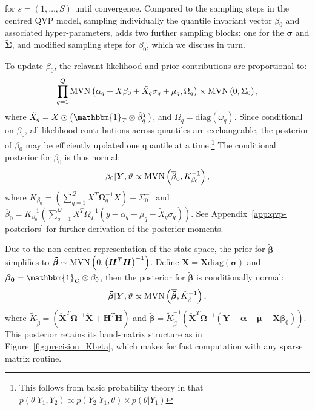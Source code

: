 %
for $s=(1,\dotsc,S)$ until convergence. Compared to the sampling steps in the centred QVP model, sampling individually the quantile invariant vector $\beta_0$ and associated hyper-parameters, adds two further sampling blocks: one for the $\boldsymbol{\sigma}$ and $\boldsymbol{\tilde{\Sigma}}$, and modified sampling steps for $\beta_0$, which we discuss in turn.
%

%
To update $\beta_0$, the relavant likelihood and prior contributions are proportional to:
\begin{equation}
    \prod_{q=1}^Q \mathrm{MVN}\left(\alpha_q + X\beta_0 + \tilde{X}_q\sigma_q + \mu_q,\Omega_q\right) \times \mathrm{MVN}\left(0,\Sigma_0\right),
\end{equation}
%
where $\tilde{X}_q = X \odot \left(\mathbbm{1}_T\otimes \tilde{\beta}_q^T\right)$, and $\Omega_q = \text{diag}(\omega_q)$. Since conditional on $\beta_0$, all likelihood contributions across quantiles are exchangeable, the posterior of $\beta_0$ may be efficiently updated one quantile at a time.\footnote{This follows from basic probability theory in that $p(\theta|Y_1,Y_2)\propto p(Y_2|Y_1,\theta)\times p(\theta|Y_1)$} The conditional posterior for $\beta_0$ is thus normal:
%
\begin{equation}\label{eq:NC-beta0-posterior}
    \beta_0|\boldsymbol{Y},\vartheta \propto \mathrm{MVN}\left(\overline{\beta}_0,K^{-1}_{\beta_0}\right),
\end{equation}
%
where $K_{\beta_0} = (\sum_{q=1}^{\mathcal{Q}}X^T\boldsymbol{\Omega}^{-1}_qX) + \Sigma_0^{-1}$ and $\overline{\beta}_0  = K^{-1}_{\beta_0}(\sum_{q=1}^{\mathcal{Q}}X^T\Omega_q^{-1}(y - \alpha_q - \mu_q - \tilde{X}_q\sigma_q))$. See Appendix~\ref{app:qvp-posteriors} for further derivation of the posterior moments.
%

Due to the non-centred representation of the state-space, the prior for $\boldsymbol{\tilde{\beta}}$ simplifies to $\boldsymbol{\tilde{\beta}} \sim \mathrm{MVN}\left(0,\left(\boldsymbol{H}^T\boldsymbol{H}\right)^{-1}\right)$. Define $\boldsymbol{\check{X}} = \boldsymbol{X}\text{diag}(\boldsymbol{\sigma})$ and $\boldsymbol{\beta_0} = \mathbbm{1}_{\mathcal{Q}} \otimes \beta_0$, then the posterior for $\boldsymbol{\tilde{\beta}}$ is conditionally normal:
%
\begin{equation}
    \boldsymbol{\tilde{\beta}} | \boldsymbol{Y},\vartheta \propto \mathrm{MVN}\left(\overline{\boldsymbol{\tilde{\beta}}},\tilde{K}_{\tilde{\beta}}^{-1}\right),
\end{equation}
%
where $\tilde{K}_{\tilde{\beta}} = (\boldsymbol{\check{X}}^{T}\boldsymbol{\Omega}^{-1}\boldsymbol{\check{X}} + \boldsymbol{H}^T\boldsymbol{H})$ and $\boldsymbol{\tilde{\beta}} = \tilde{K}_{\tilde{\beta}}^{-1}(\boldsymbol{\check{X}}^{T}\boldsymbol{\Omega}^{-1}(\boldsymbol{Y}-\boldsymbol{\alpha} - \boldsymbol{\mu} - \boldsymbol{X}\boldsymbol{\beta}_0))$. This posterior retains its band-matrix structure as in Figure~\ref{fig:precision_Kbeta}, which makes for fast computation with any sparse matrix routine.
%

